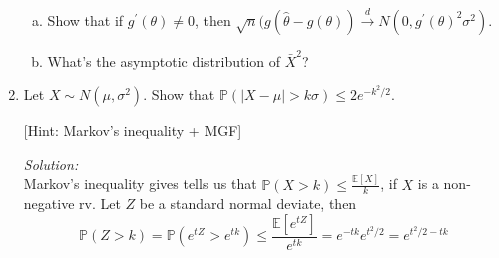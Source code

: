 \documentclass[12pt]{article}
\newif\ifsln
\newcommand{\E}{\mathbb{E}}
\renewcommand{\P}{\mathbb{P}}
\begin{document}
\begin{enumerate}[1.]
\begin{enumerate}[a)]
	\item  Show that if $g^{\prime}(\theta) \not = 0$, then $\sqrt{n}(g(\hat{\theta} - g(\theta)) \overset{d}{\to} N(0, g^{\prime}(\theta)^{2} \sigma^{2})$.
	\item What's the asymptotic distribution of $\bar{X}^{2}$?
\end{enumerate}

\ifsln
\textit{Solution:}\\
a) By the intermediate value theorem, there exists a $c \in [\theta, \hat{\theta}]$ such that 
\[\sqrt{n}(g(\hat{\theta}) - (\theta)) = g^{\prime}(c) \sqrt{n}(\hat{\theta} - \theta)\]

Since $\hat{\theta} \overset{p}{\to} \theta$ and $\theta \leq c \leq \hat{\theta}$, the squeeze theorem tells us that $c \overset{p}{\to} \theta$. Since $\sqrt{n}(\hat{\theta} - \theta)$ is asymtotically normal, Slutsky's theorem tells us that 
\[\sqrt{n}(g(\hat{\theta}) - g(\theta)) \overset{d}{\to} N(0, g^{\prime}(\theta)^{2} \sigma^{2})\]

In order to not have the distribution collapse, we must have $g^{\prime}(\theta) \not = 0$.\bigskip

b) If $\mu = \E[X] \not =0$, set $g(x) = x^{2}$. $g^{\prime}(\mu) = 2\mu$. Appealing to the central limit theorem for asymptotic normality and applying the above theorem gives $\sqrt{n}(\bar{X}^{2} - \mu^{2}) \overset{d}{\to} N(0, 4\mu^{2}\sigma^{2})$.\medskip

If $\mu = 0$, then $\sqrt{n}\bar{X} \overset{d}{\to} N(0, \sigma^{2})$, so $\frac{\sqrt{n}\bar{X}}{\sigma} \overset{d}{\to} N(0, 1)$. Therefore $\left(\frac{\sqrt{n}\bar{X}}{\sigma}\right)^{2} = \frac{n\bar{X}^{2}}{\sigma^{2}} \overset{d}{\to} \chi^{2}(1)$, so $n\bar{X}^{2} \overset{d}{\to} \sigma^{2}\chi^{2}(1)$.
\fi 

\item Let $X \sim N(\mu, \sigma^{2})$. Show that $\P(|X - \mu| > k \sigma) \leq 2e^{-k^{2}/2}$.\smallskip

[Hint: Markov's inequality + MGF]


\ifsln
\textit{Solution:}\\
Markov's inequality gives tells us that $\P(X > k) \leq \frac{\E[X]}{k}$, if $X$ is a non-negative rv. Let $Z$ be a standard normal deviate, then 
\[\P(Z > k) = \P(e^{tZ} > e^{tk}) \leq \frac{\E[e^{tZ}]}{e^{tk}} = e^{-tk} e^{t^{2}/2} = e^{t^{2}/2 - tk}\]


\end{enumerate}
\end{document}
